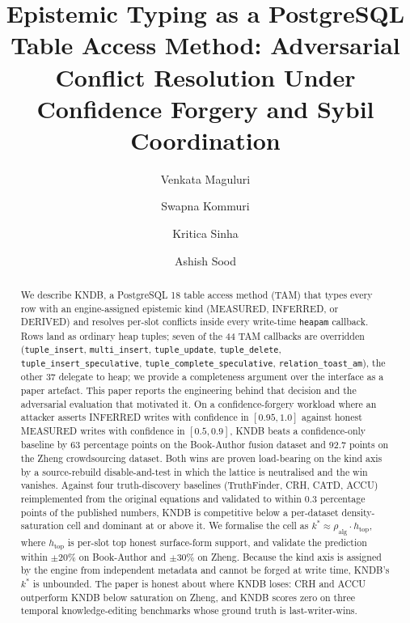 \documentclass[sigconf, nonacm]{acmart}
\begin{document}
\title{Epistemic Typing as a PostgreSQL Table Access Method: Adversarial Conflict Resolution Under Confidence Forgery and Sybil Coordination}

\author{Venkata Maguluri}

\author{Swapna Kommuri}

\author{Kritica Sinha}

\author{Ashish Sood}

\begin{abstract}
We describe KNDB, a PostgreSQL 18 table access method (TAM) that types every row with an engine-assigned epistemic kind (MEASURED, INFERRED, or DERIVED) and resolves per-slot conflicts inside every write-time \texttt{heapam} callback. Rows land as ordinary heap tuples; seven of the 44 TAM callbacks are overridden (\texttt{tuple\_insert}, \texttt{multi\_insert}, \texttt{tuple\_update}, \texttt{tuple\_delete}, \texttt{tuple\_insert\_speculative}, \texttt{tuple\_complete\_speculative}, \texttt{relation\_toast\_am}), the other 37 delegate to heap; we provide a completeness argument over the interface as a paper artefact. This paper reports the engineering behind that decision and the adversarial evaluation that motivated it. On a confidence-forgery workload where an attacker asserts INFERRED writes with confidence in $[0.95, 1.0]$ against honest MEASURED writes with confidence in $[0.5, 0.9]$, KNDB beats a confidence-only baseline by 63 percentage points on the Book-Author fusion dataset and 92.7 points on the Zheng crowdsourcing dataset. Both wins are proven load-bearing on the kind axis by a source-rebuild disable-and-test in which the lattice is neutralised and the win vanishes. Against four truth-discovery baselines (TruthFinder, CRH, CATD, ACCU) reimplemented from the original equations and validated to within 0.3 percentage points of the published numbers, KNDB is competitive below a per-dataset density-saturation cell and dominant at or above it. We formalise the cell as $k^{*} \approx \rho_{\text{alg}} \cdot h_{\text{top}}$, where $h_{\text{top}}$ is per-slot top honest surface-form support, and validate the prediction within $\pm 20\%$ on Book-Author and $\pm 30\%$ on Zheng. Because the kind axis is assigned by the engine from independent metadata and cannot be forged at write time, KNDB's $k^{*}$ is unbounded. The paper is honest about where KNDB loses: CRH and ACCU outperform KNDB below saturation on Zheng, and KNDB scores zero on three temporal knowledge-editing benchmarks whose ground truth is last-writer-wins.
\end{abstract}
\end{document}
